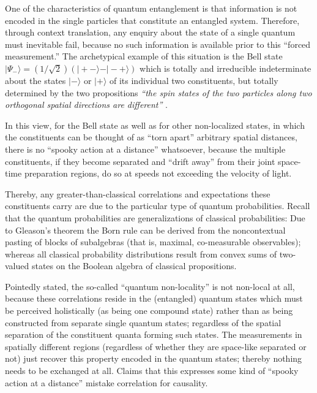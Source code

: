 \documentclass[%
  twocolumn,
 showpacs,
 showkeys,
 preprintnumbers,
 amsmath,amssymb,
 aps,
 prl,
  longbibliography,
 ]{revtex4-1}
\theoremstyle{definition}
\theoremstyle{remark}
\begin{document}
One of the characteristics of quantum entanglement is that information is not encoded in the single particles that constitute
an entangled system. Therefore, through context translation, any enquiry about the state of a single quantum
must inevitable fail, because no such information is available prior to this ``forced measurement.''
The archetypical example of this situation is the  Bell state
$\vert \Psi_- \rangle = \left( 1/\sqrt{2} \right) \left(\vert +-\rangle - \vert -+\rangle \right)$
which is totally and irreducible indeterminate about the states $\vert -\rangle$ or $\vert +\rangle$
of its individual two constituents,
but totally determined by the two propositions  {\em ``the spin states of the two particles along two orthogonal spatial directions
are different''}   \cite{Zeilinger-97,zeil-99,svozil-2002-statepart-prl}.

In this view,
for the Bell state as well as for other non-localized states,
in which the constituents can be thought of as ``torn apart'' arbitrary spatial distances,
there is no ``spooky action at a distance'' \cite{Nikolic} whatsoever,
because the multiple constituents, if they become separated and ``drift away'' from their joint space-time preparation regions,
do so at speeds not exceeding the velocity of light.

Thereby, any greater-than-classical correlations and expectations these constituents carry are due to the particular type
of quantum probabilities.
Recall that the quantum probabilities are generalizations of classical probabilities:
Due to Gleason's theorem the Born rule can be derived from
the noncontextual pasting of blocks of subalgebras (that is, maximal, co-measurable observables);
whereas all classical probability distributions result from convex sums of two-valued states on the Boolean algebra of classical propositions.

Pointedly stated, the so-called ``quantum non-locality'' is not non-local at all, because
these correlations reside in the (entangled) quantum states which must be perceived holistically (as being one compound state)
rather than as being constructed from separate single quantum states; regardless of the spatial separation
of the constituent quanta forming such states.
The measurements in spatially different regions (regardless of whether they are space-like separated or not)
just recover this property encoded in the quantum states; thereby nothing needs to be exchanged at all.
Claims that this expresses some kind of ``spooky action at a distance'' mistake correlation for causality.
\end{document}
